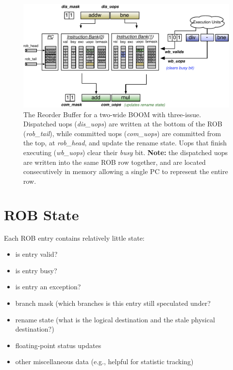 

\begin{figure}[htb]
	\centering
	\centerline{\includegraphics[scale =1] {figures/rob}}
	\caption{ \small The Reorder Buffer for a two-wide BOOM with three-issue. Dispatched uops ({\em dis\_uops}) are written at the bottom of the ROB ({\em rob\_tail}), while committed uops ({\em com\_uops}) are committed from the top, at {\em rob\_head}, and update the rename state. Uops that finish executing ({\em wb\_uops}) clear their {\em busy} bit. {\bf Note:} the dispatched uops are written into the same ROB row together, and are located consecutively in memory allowing a single PC to represent the entire row. }
	\label{fig:rob}
\end{figure}

\section{ROB State}

Each ROB entry contains relatively little state:

\begin{itemize}
\item is entry valid?
\item is entry busy?
\item is entry an exception?
\item branch mask (which branches is this entry still speculated under? 
\item rename state (what is the logical destination and the stale physical destination?)
\item floating-point status updates
\item other miscellaneous data (e.g., helpful for statistic tracking)
\end{itemize}

